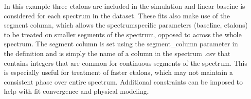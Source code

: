 \documentclass[letterpaper,10pt,english]{sphinxmanual}
\begin{document}
\sphinxAtStartPar
In this example three etalons are included in the simulation and linear baseine is considered for each spectrum in the dataset.  These fits also make use of the segment column, which allows the spectrum\sphinxhyphen{}specific parameters (baseline, etalons) to be treated on smaller segments of the spectrum, opposed to across the whole spectrum. The segment column is set using the segment\_column parameter in the {\hyperref[\detokenize{MATS:MATS.spectrum.Spectrum}]{}} definition and is simply the name of a column in the spectrum .csv that contains integers that are common for continuous segments of the spectrum.   This is especially useful for treatment of faster etalons, which may not maintain a consistent phase over entire spectrum.  Additional constraints can be imposed to help with fit convergence and physical modeling.
\end{document}
